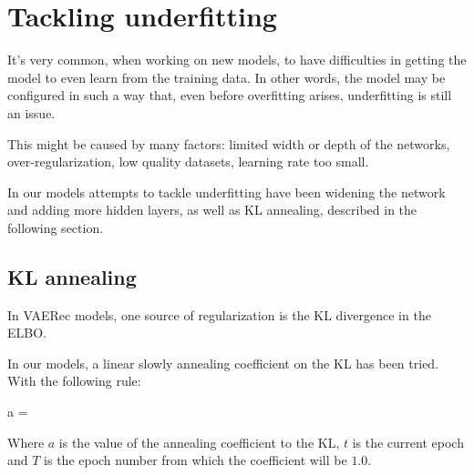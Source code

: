 \section{Tackling underfitting}

It's very common, when working on new models, to have difficulties
in getting the model to even learn from the training data.
In other words, the model may be configured in such a way that,
even before overfitting arises, underfitting is still an issue.

This might be caused by many factors: limited width or depth of the networks,
over-regularization, low quality datasets, learning rate too small.

In our models attempts to tackle underfitting have been widening the network
and adding more hidden layers, as well as KL annealing, described in the following section.

\subsection{KL annealing}

In VAERec models, one source of regularization is the KL divergence in the ELBO.

In our models, a linear slowly annealing coefficient on the KL
has been tried. With the following rule:

\begin{nalign}
a = 
\end{nalign}

Where $a$ is the value of the annealing coefficient to the KL, $t$ is the current
epoch and $T$ is the epoch number from which the coefficient will be $1.0$.

